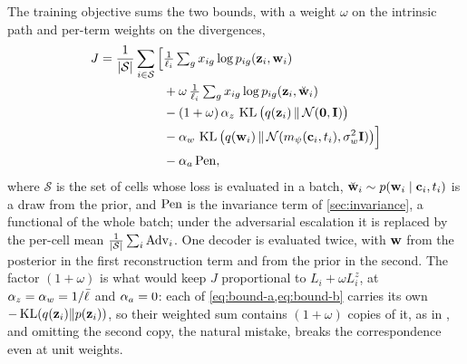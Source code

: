 The training objective sums the two bounds, with a weight $\omega$ on the intrinsic path and per-term weights on the divergences,
\begin{equation}
\begin{split}
  J = \frac{1}{|\mathcal{S}|}\sum_{i \in \mathcal{S}} \Big[
  & \tfrac{1}{\ell_i}\textstyle\sum_g x_{ig} \log p_{ig}(\mathbf{z}_i, \mathbf{w}_i) \\
  & + \omega\, \tfrac{1}{\ell_i}\textstyle\sum_g x_{ig} \log p_{ig}(\mathbf{z}_i, \breve{\mathbf{w}}_i) \\
  & - (1+\omega)\,\alpha_z\, \operatorname{KL}\big(q(\mathbf{z}_i)\,\|\,\mathcal{N}(\mathbf{0},\mathbf{I})\big) \\
  & - \alpha_w\, \operatorname{KL}\big(q(\mathbf{w}_i)\,\|\,\mathcal{N}(m_{\psi}(\mathbf{c}_i,t_i), \sigma_w^2\mathbf{I})\big) \Big] \\
  & - \alpha_a\, \mathrm{Pen},
\end{split}
\label{eq:objective}
\end{equation}
 where $\mathcal{S}$ is the set of cells whose loss is evaluated in a batch, $\breve{\mathbf{w}}_i \sim p(\mathbf{w}_i \mid \mathbf{c}_i, t_i)$ is a draw from the prior, and $\mathrm{Pen}$ is the invariance term of \cref{sec:invariance}, a functional of the whole batch; under the adversarial escalation it is replaced by the per-cell mean $\frac{1}{|\mathcal{S}|}\sum_i \mathrm{Adv}_i$. One decoder is evaluated twice, with $\mathbf{w}$ from the posterior in the first reconstruction term and from the prior in the second. The factor $(1+\omega)$ is what would keep $J$ proportional to $L_i + \omega L_i^{z}$, at $\alpha_z = \alpha_w = 1/\bar{\ell}$ and $\alpha_a = 0$: each of \cref{eq:bound-a,eq:bound-b} carries its own $-\operatorname{KL}(q(\mathbf{z}_i)\|p(\mathbf{z}_i))$, so their weighted sum contains $(1+\omega)$ copies of it, as in \citet[eq.~6]{slavutsky2025}, and omitting the second copy, the natural mistake, breaks the correspondence even at unit weights.

